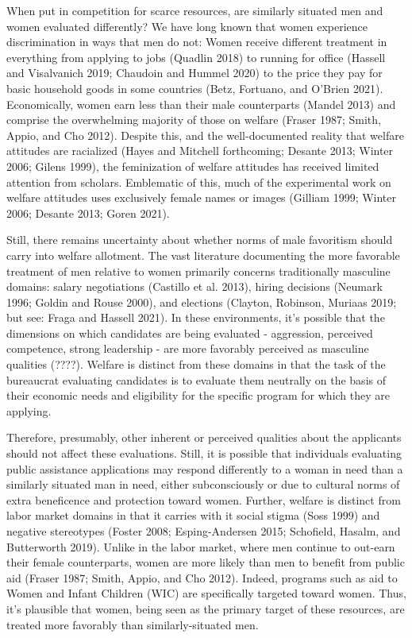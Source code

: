 \documentclass[12pt]{article}%
\begin{document}
\begin{doublespace}
When put in competition for scarce resources, are similarly situated men and women evaluated differently? We have long known that women experience discrimination in ways that men do not: Women receive different treatment in everything from applying to jobs (Quadlin 2018) to running for office (Hassell and Visalvanich 2019; Chaudoin and Hummel 2020) to the price they pay for basic household goods in some countries (Betz, Fortuano, and O’Brien 2021). Economically, women earn less than their male counterparts (Mandel 2013) and comprise the overwhelming majority of those on welfare (Fraser 1987; Smith, Appio, and Cho 2012). Despite this, and the well-documented reality that welfare attitudes are racialized (Hayes and Mitchell forthcoming; Desante 2013; Winter 2006; Gilens 1999), the feminization of welfare attitudes has received limited attention from scholars. Emblematic of this, much of the experimental work on welfare attitudes uses exclusively female names or images (Gilliam 1999; Winter 2006; Desante 2013; Goren 2021).


Still, there remains uncertainty about whether norms of male favoritism should carry into welfare allotment. The vast literature documenting the more favorable treatment of men relative to women primarily concerns traditionally masculine domains: salary negotiations (Castillo et al. 2013), hiring decisions (Neumark 1996; Goldin and Rouse 2000), and elections (Clayton, Robinson, Muriaas 2019; but see: Fraga and Hassell 2021). In these environments, it’s possible that the dimensions on which candidates are being evaluated - aggression, perceived competence, strong leadership - are more favorably perceived as masculine qualities (????). Welfare is distinct from these domains in that the task of the bureaucrat evaluating candidates is to evaluate them neutrally on the basis of their economic needs and eligibility for the specific program for which they are applying. 


Therefore, presumably, other inherent or perceived qualities about the applicants should not affect these evaluations. Still, it is possible that individuals evaluating public assistance applications may respond differently to a woman in need than a similarly situated man in need, either subconsciously or due to cultural norms of extra beneficence and protection toward women. Further, welfare is distinct from labor market domains in that it carries with it social stigma (Soss 1999) and negative stereotypes (Foster 2008; Esping-Andersen 2015; Schofield, Hasalm, and Butterworth 2019). Unlike in the labor market, where men continue to out-earn their female counterparts, women are more likely than men to benefit from public aid (Fraser 1987; Smith, Appio, and Cho 2012). Indeed, programs such as aid to Women and Infant Children (WIC) are specifically targeted toward women. Thus, it’s plausible that women, being seen as the primary target of these resources, are treated more favorably than similarly-situated men.  



\end{doublespace}
\end{document}
